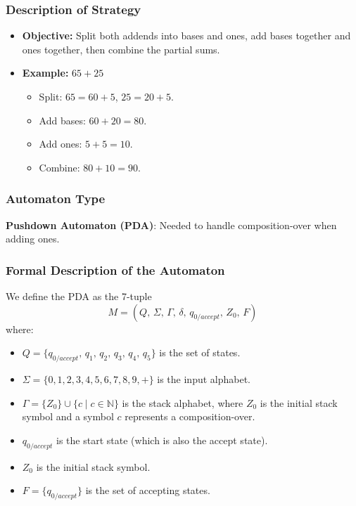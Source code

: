 \documentclass[11pt]{article}
\begin{document}
\subsubsection*{Description of Strategy}
\begin{itemize}
    \item \textbf{Objective:} Split both addends into bases and ones, add bases together and ones together, then combine the partial sums.
    \item \textbf{Example:} \(65 + 25\)
    \begin{itemize}
        \item Split: \(65 = 60 + 5\), \(25 = 20 + 5\).
        \item Add bases: \(60 + 20 = 80\).
        \item Add ones: \(5 + 5 = 10\).
        \item Combine: \(80 + 10 = 90\).
    \end{itemize}
\end{itemize}

\subsubsection*{Automaton Type}
\textbf{Pushdown Automaton (PDA)}: Needed to handle composition-over when adding ones.

\subsubsection*{Formal Description of the Automaton}

We define the PDA as the 7-tuple
\[
M = (Q,\, \Sigma,\, \Gamma,\, \delta,\, q_{0/accept},\, Z_0,\, F)
\]
where:
\begin{itemize}
    \item \(Q = \{q_{0/accept},\, q_1,\, q_2,\, q_3,\, q_4,\, q_5\}\) is the set of states.
    \item \(\Sigma = \{0,1,2,3,4,5,6,7,8,9,+\}\) is the input alphabet.
    \item \(\Gamma = \{Z_0\} \cup \{c \mid c \in \mathbb{N}\}\) is the stack alphabet, where \(Z_0\) is the initial stack symbol and a symbol \(c\) represents a composition-over.
    \item \(q_{0/accept}\) is the start state (which is also the accept state).
    \item \(Z_0\) is the initial stack symbol.
    \item \(F = \{q_{0/accept}\}\) is the set of accepting states.
\end{itemize}
\end{document}
